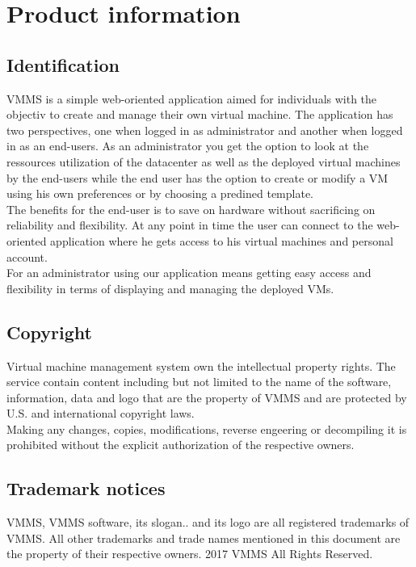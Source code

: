 \chapter{Product information}
\vspace{-6em}


\section{Identification}
VMMS is a simple web-oriented application aimed for individuals with the
objectiv to create and manage their own virtual machine. The application    
has two perspectives, one when logged in as administrator and another when
logged in as an end-users. As an administrator you get the option to look at
the ressources utilization of the datacenter as well as the deployed virtual
machines by the end-users while the end user has the option to create or modify 
a VM using his own preferences or by choosing a predined template.\\The benefits
for the end-user is to save on hardware without sacrificing on reliability and 
flexibility. At any point in time the user can connect to the web-oriented
application where he gets access to his virtual machines and personal
account.\\For an administrator using our application means getting easy access 
and flexibility in terms of displaying and managing the deployed VMs.

\section{Copyright}

Virtual machine management system own the intellectual property rights. The
service contain content including  but not limited to the name of the software,
information, data and logo that are the property of VMMS and are protected by
U.S. and international copyright laws.\\Making any changes, copies,
modifications, reverse engeering or decompiling it is prohibited without the
explicit authorization of the respective owners.

\section{Trademark notices}

VMMS, VMMS software, its slogan.. and its logo are all registered trademarks of
VMMS. All other trademarks and trade names mentioned in this document are the
property of their respective owners. 2017 VMMS All Rights Reserved.


